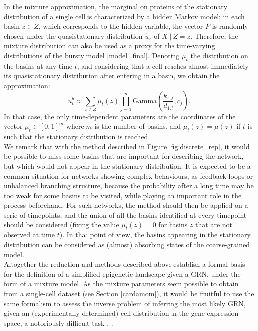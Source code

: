 In the mixture approximation, the marginal on proteins of the stationary distribution of a single cell is characterized by a hidden Markov model: in each basin $z \in Z$, which corresponds to the hidden variable,  the vector $P$ is randomly chosen under the quasistationary distribution $\hat{u}_{z}$ of $X \mid Z = z$. Therefore, the mixture distribution can also be used as a proxy for the time-varying distributions of the bursty model \eqref{model_final}. Denoting $\mu_t$ the distribution on the basins at any time $t$, and considering that a cell reaches almost immediately its quasistationary distribution after entering in a basin, we obtain the approximation:
$$u_t^\theta \approx \sum\limits_{z \in Z}\mu_{t}(z)\prod\limits_{j=1}^n \textrm{Gamma}\left(\frac{k_{z, j}}{d_{1,i}}, c_j\right).$$
In that case, the only time-dependent parameters are the coordinates of the vector $\mu_{t} \in [0,1]^m$ where $m$ is the number of basins, and $\mu_{t}(z) = \mu(z)$ if $t$ is such that the stationary distribution is reached.\\

We remark that with the method described in Figure \ref{fig:discrete_rep}, it would be possible to miss some basins that are important for describing the network, but which would not appear in the stationary distribution. It is expected to be a common situation for networks showing complex behaviours, as feedback loops or unbalanced branching structure, because the probability after a long time may be too weak for some basins to be visited, while playing an important role in the process beforehand. For such networks, the method should then be applied on a serie of timepoints, and the union of all the basins identified at every timepoint should be considered (fixing the value $\mu_t(z) = 0$ for basins $z$ that are not observed at time $t$). In that point of view, the basins appearing in the stationary distribution can be considered as (almost) absorbing states of the coarse-grained model.\\

Altogether the reduction and methods described above establish a formal basis for the definition of a simplified epigenetic landscape given a GRN, under the form of a mixture model. As the mixture parameters seem possible to obtain from a single-cell dataset (see Section \ref{cardamom}), it would be fruitful to use the same formalism to assess the inverse problem of inferring the most likely GRN, given an (experimentally-determined) cell distribution in the gene expression space, a notoriously difficult task \cite{Pratapa_2020}, \cite{herbachinferring2017}. 

